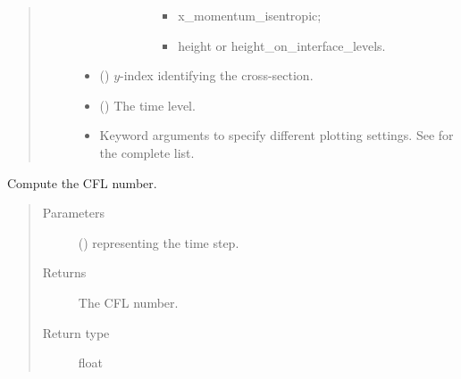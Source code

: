 \documentclass[letterpaper,10pt,english]{sphinxmanual}
\begin{document}
\begin{fulllineitems}
\begin{fulllineitems}
\begin{quote}
\begin{description}
\begin{itemize}
\begin{itemize}
\begin{description}
\begin{itemize}
\item {} 
x\_momentum\_isentropic;

\item {} 
height or height\_on\_interface\_levels.

\end{itemize}

\end{description}

\end{itemize}


\item {} 
 () \textendash{} \(y\)-index identifying the cross-section.

\item {} 
 () \textendash{} The time level.

\item {} 
 \textendash{} Keyword arguments to specify different plotting settings.
See {\hyperref[\detokenize{api:tasmania.utils.utils_plot.contourf_xz}]{}} for the complete list.

\end{itemize}

\end{description}\end{quote}

\end{fulllineitems}


\begin{fulllineitems}
\label{\detokenize{api:storages.state_isentropic.StateIsentropic.get_cfl}}
Compute the CFL number.
\begin{quote}\begin{description}
\item[{Parameters}] \leavevmode
{} () \textendash{}  representing the time step.

\item[{Returns}] \leavevmode
The CFL number.

\item[{Return type}] \leavevmode
float


\end{description}
\end{quote}
\end{fulllineitems}
\end{fulllineitems}
\end{document}
